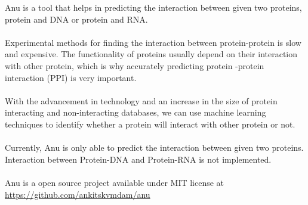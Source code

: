 \documentclass[../main.tex]{subfiles}
\begin{document}
Anu is a tool that helps in predicting the interaction between given
two proteins, protein and DNA or protein and RNA. \\ \\
Experimental methods for finding the interaction between protein-protein
is slow and expensive. The functionality of proteins usually depend on their
interaction with other protein, which is why accurately predicting protein
-protein interaction (PPI) is very important. \\ \\
With the advancement in technology and an increase in the size of protein
interacting and non-interacting databases, we can use machine learning
techniques to identify whether a protein will interact with other protein
or not. \\
\\
Currently, Anu is only able to predict the interaction between given
two proteins. Interaction between Protein-DNA and Protein-RNA is not
implemented. \\ \\
Anu is a open source project available under MIT license at \\
\href{https://github.com/ankitskvmdam/anu}{https://github.com/ankitskvmdam/anu}
\end{document}
